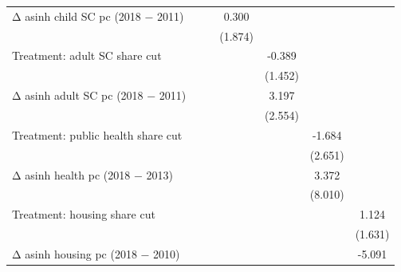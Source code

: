 \begin{table}[htbp]
\begin{tabular}{l*{6}{c}}
\addlinespace
Δ asinh child SC pc (2018 − 2011)&                     &                     &       0.300         &                     &                     &                     \\
                    &                     &                     &     (1.874)         &                     &                     &                     \\
\addlinespace
Treatment: adult SC share cut&                     &                     &                     &      -0.389         &                     &                     \\
                    &                     &                     &                     &     (1.452)         &                     &                     \\
\addlinespace
Δ asinh adult SC pc (2018 − 2011)&                     &                     &                     &       3.197         &                     &                     \\
                    &                     &                     &                     &     (2.554)         &                     &                     \\
\addlinespace
Treatment: public health share cut&                     &                     &                     &                     &      -1.684         &                     \\
                    &                     &                     &                     &                     &     (2.651)         &                     \\
\addlinespace
Δ asinh health pc (2018 − 2013)&                     &                     &                     &                     &       3.372         &                     \\
                    &                     &                     &                     &                     &     (8.010)         &                     \\
\addlinespace
Treatment: housing share cut&                     &                     &                     &                     &                     &       1.124         \\
                    &                     &                     &                     &                     &                     &     (1.631)         \\
\addlinespace
Δ asinh housing pc (2018 − 2010)&                     &                     &                     &                     &                     &      -5.091\sym{***}\\

\end{tabular}
\end{table}

